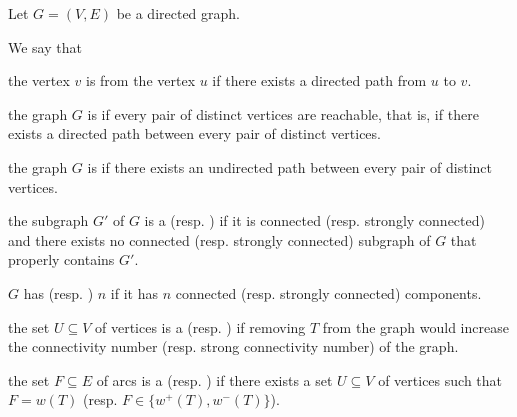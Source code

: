 \begin{definition}\label{def:graph_connectivity}
  Let \( G = (V, E) \) be a directed graph.

  We say that
  \begin{defenum}
     the vertex \( v \) is  from the vertex \( u \) if there exists a directed path from \( u \) to \( v \).

    \cite[chapter 1, section 3.5]{Gondran1984} the graph \( G \) is  if every pair of distinct vertices are reachable, that is, if there exists a directed path between every pair of distinct vertices.

    \cite[chapter 1, section 3.3]{Gondran1984} the graph \( G \) is  if there exists an undirected path between every pair of distinct vertices.

    \cite[chapter 1, sections 3.3 and 3.5]{Gondran1984} the subgraph \( G' \) of \( G \) is a  (resp. ) if it is connected (resp. strongly connected) and there exists no connected (resp. strongly connected) subgraph of \( G \) that properly contains \( G' \).

    \cite[chapter 1, sections 3.3 and 3.5]{Gondran1984} \( G \) has  (resp. ) $n$ if it has $n$ connected (resp. strongly connected) components.

    \cite[chapter 1, section 3.4]{Gondran1984} the set \( U \subseteq V \) of vertices is a  (resp. ) if removing \( T \) from the graph would increase the connectivity number (resp. strong connectivity number) of the graph.

    \cite[chapter 1, section 4.4]{Gondran1984} the set \( F \subseteq E \) of arcs is a  (resp. ) if there exists a set \( U \subseteq V \) of vertices such that \( F = w(T) \) (resp. \( F \in \{ w^+(T), w^-(T) \} \)).
  \end{defenum}
\end{definition}

